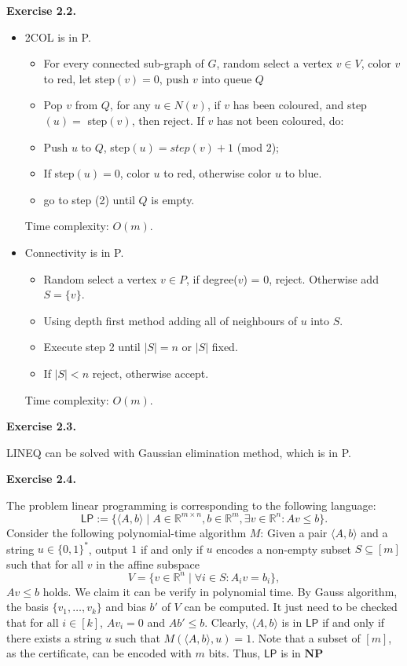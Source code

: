 \documentclass[a4paper]{article}
\newenvironment{exercise}[1]{
	\par
	\noindent\textbf{Exercise #1.}\quad
}{
	\par
	\bigskip
}
\begin{document}
\begin{exercise}{2.2}
\begin{itemize}
\item 2COL is in P. %
\begin{itemize}
\item For every connected sub-graph of $G$, random select a vertex $v\in V$, color $v$ to red, let step$(v) = 0$, push $v$ into queue $Q$\;
\item \quad Pop $v$ from $Q$, for any $u \in N(v)$, if $v$ has been coloured, and step$(u)=$ step$(v)$, then reject. If $v$ has not been coloured, do:
\item \quad \quad Push $u$ to $Q$, step$(u)=step(v) + 1$ (mod $2$);
\item \quad \quad If step$(u)=0$, color $u$ to red, otherwise color $u$ to blue.
\item \quad go to step (2) until $Q$ is empty.
\end{itemize}
Time complexity: $O(m)$.
\item Connectivity is in P.
\begin{itemize}
\item Random select a vertex $v\in P$, if degree($v$) = 0, reject. Otherwise add $S = \{v\}$.
\item Using depth first method adding all of neighbours of $u$ into $S$.
\item Execute step 2 until $|S| = n$ or $|S|$ fixed.
\item If $|S|< n$ reject, otherwise accept.
\end{itemize}
Time complexity: $O(m)$.
\end{itemize}
\end{exercise}

\begin{exercise}{2.3}
    LINEQ can be solved with Gaussian elimination method, which is in P.
\end{exercise}

\begin{exercise}{2.4}
	The problem linear programming is corresponding to the following language:
	\[
		\mathsf{LP} := \{\langle A,b \rangle \mid A \in \mathbb{R}^{m\times n}, b \in \mathbb{R}^m, \exists v \in \mathbb{R}^n: Av \leq b\}.
	\]
	Consider the following polynomial-time algorithm $M$: Given a pair $\langle A,b \rangle$ and a string $u \in \{0,1\}^*$, output $1$ if and only if $u$ encodes a non-empty subset $S \subseteq [m]$ such that for all $v$ in the affine subspace
	\[
		V = \{v \in \mathbb{R}^n \mid \forall i \in S: A_i v = b_i\},
	\]
	$Av \leq b$ holds. We claim it can be verify in polynomial time. By Gauss algorithm, the basis $\{v_1,\ldots,v_k\}$ and bias $b'$ of $V$ can be computed. It just need to be checked that for all $i\in [k]$, $A v_i = 0$ and $Ab' \leq b$. Clearly, $\langle A,b \rangle$ is in $\mathsf{LP}$ if and only if there exists a string $u$ such that $M(\langle A,b \rangle, u) = 1$. Note that a subset of $[m]$, as the certificate, can be encoded with $m$ bits. Thus, $\mathsf{LP}$ is in $\mathbf{NP}$
\end{exercise}
\end{document}
